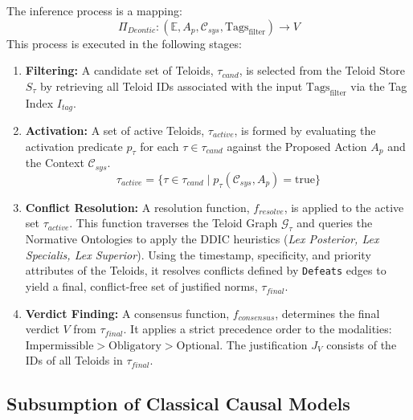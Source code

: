 \begin{definition}
\label{def:ethos_deontic_inference} 
The inference process is a mapping:
\[ \Pi_{Deontic}: (\mathbb{E}, A_p, \mathcal{C}_{sys}, \text{Tags}_{\text{filter}}) \to V \]
This process is executed in the following stages:
\begin{enumerate}
    \item \textbf{Filtering:} A candidate set of Teloids, \(\tau_{cand}\), is selected from the Teloid Store \(S_\tau\) by retrieving all Teloid IDs associated with the input \(\text{Tags}_{\text{filter}}\) via the Tag Index \(I_{tag}\).
    
    \item \textbf{Activation:} A set of active Teloids, \(\tau_{active}\), is formed by evaluating the activation predicate \(p_\tau\) for each \(\tau \in \tau_{cand}\) against the Proposed Action \(A_p\) and the Context \(\mathcal{C}_{sys}\).
    \[ \tau_{active} = \{ \tau \in \tau_{cand} \mid p_\tau(\mathcal{C}_{sys}, A_p) = \text{true} \} \]
    
	\item \textbf{Conflict Resolution:} A resolution function, \(f_{resolve}\), is applied to the active set \(\tau_{active}\). This function traverses the Teloid Graph \(\mathcal{G}_\tau\) and queries the Normative Ontologies to apply the DDIC heuristics (\textit{Lex Posterior, Lex Specialis, Lex Superior}). Using the timestamp, specificity, and priority attributes of the Teloids, it resolves conflicts defined by \texttt{Defeats} edges to yield a final, conflict-free set of justified norms, \(\tau_{final}\).
    
    \item \textbf{Verdict Finding:} A consensus function, \(f_{consensus}\), determines the final verdict \(V\) from \(\tau_{final}\). It applies a strict precedence order to the modalities: \(\text{Impermissible} > \text{Obligatory} > \text{Optional}\). The justification \(J_V\) consists of the IDs of all Teloids in \(\tau_{final}\).
\end{enumerate}
\end{definition} 


\subsection{Subsumption of Classical Causal Models}
\label{sec:subsumption_classical}

